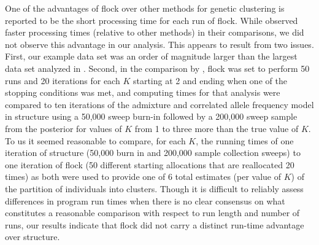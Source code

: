  
One of the advantages of {\sc flock} over other methods for genetic clustering
is reported to be the short processing time for each run of {\sc flock}.
While \citet{Duc&Tur2012} observed faster processing times (relative to other methods) in their 
comparisons, we did not observe this advantage in our analysis. This appears to result from two issues. First,
our example data set was an order of magnitude larger than the largest data set analyzed in \citet{Duc&Tur2012}.  
Second, in the comparison by \citet{Duc&Tur2012}, 
{\sc flock} was set to perform 50 runs and 20 iterations for each $K$ starting at 2 and ending when 
one of the stopping conditions was met, and computing times for that analysis were compared to ten iterations of 
the admixture and correlated allele frequency model in {\sc structure} using 
a 50,000 sweep burn-in followed 
by a 200,000 sweep sample from the posterior for values of $K$ from 1 to three more than the true 
value of $K$. 
To us it seemed reasonable to compare, for each $K$, the running times of one iteration of {\sc structure} (50,000 
burn in and 200,000 sample collection sweeps)
to one iteration of {\sc flock} (50 different starting allocations that are reallocated 20 times) 
as both were used to provide one of 6 total estimates (per value of $K$) of the partition of individuals into 
clusters. Though
it is difficult to reliably assess differences in program run times when there is no clear consensus on what 
constitutes a reasonable comparison with respect to run length and number of runs, our results indicate 
that {\sc flock} did not carry a distinct run-time advantage over {\sc structure}.

